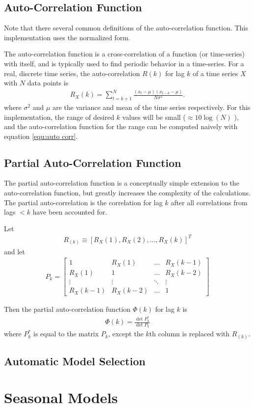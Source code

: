 \subsection{Auto-Correlation Function}
Note that there several common definitions of the auto-correlation function.  This implementation uses the normalized form.  

The auto-correlation function  is a cross-correlation of a function (or time-series) with itself, and is typically used to find periodic behavior in a time-series.  For a real, discrete time series, the auto-correlation  $R(k)$ for lag $k$ of a time series $X$ with $N$ data points  is 
\begin{align}\label{equ:auto corr}
R_X(k) =\sum_{t=k+1}^N  \frac{(x_t -\mu) (x_{t-k} - \mu)}{N \sigma^2} .  
\end{align}
where $\sigma^2$ and $\mu$ are the variance and mean of the time series respectively.    
For this implementation, the range of desired $k$ values will be small ($\approx 10\log(N)$ ), and the auto-correlation function for the range can be computed naively with equation \ref{equ:auto corr}.  

\subsection{Partial Auto-Correlation Function}
The partial auto-correlation function is a conceptually simple extension to the auto-correlation function, but greatly increases the complexity of the calculations.  The partial auto-correlation is the correlation for lag $k$ after all correlations from lags $<k$ have been accounted for. 

Let 
\begin{align}
R_{(k)} \equiv  \left[ R_X(1), R_X(2), \dots, R_X(k)\right]^T
\end{align}
and let
\begin{align}
P_k = \left[ \begin{matrix}
1 &  R_X(1) & \dots & R_X(k-1) \\
R_X(1) & 1 & \dots & R_X(k-2) \\
\vdots & \vdots & \ddots & \vdots \\
R_X(k-1) &R_X(k-2) & \dots & 1 \end{matrix} \right]
\end{align}

Then the partial auto-correlation function $\Phi(k)$ for lag $k$ is 
\begin{align}
\Phi(k) = \frac{ \det P^*_k}{\det P_k}
\end{align}
where $P^*_k$ is equal to the matrix $P_k$, except the $k$th column is replaced with $R_{(k)}$.  

\subsection{Automatic Model Selection}

\section{Seasonal Models}